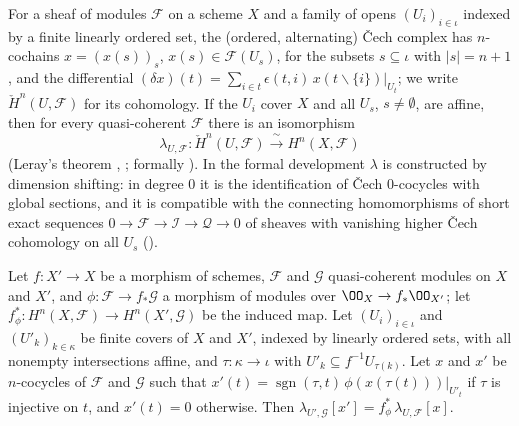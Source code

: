 For a sheaf of modules $\mathcal F$ on a scheme $X$ and a family of opens $(U_i)_{i\in\iota}$ indexed by a finite linearly ordered set, the
(ordered, alternating) \v{C}ech complex has $n$-cochains $x=(x(s))_{s}$, $x(s)\in\mathcal F(U_s)$, for the subsets $s\subseteq\iota$ with $|s|=n+1$,
and the differential $(\delta x)(t)=\sum_{i\in t}\epsilon(t,i)\,x(t\smallsetminus\{i\})|_{U_t}$; we write $\check H^n(U,\mathcal F)$ for its
cohomology. If the $U_i$ cover $X$ and all $U_s$, $s\ne\emptyset$, are affine, then for every quasi-coherent $\mathcal F$ there is an
isomorphism
\[
  \lambda_{U,\mathcal F}\colon\check H^n(U,\mathcal F)\xrightarrow{\ \sim\ }H^n(X,\mathcal F)
\]
(Leray's theorem \cite[Thm.~III.4.5]{Hartshorne1977}, \cite[Tag~01XD]{Stacks2024}; formally ). In the
formal development $\lambda$ is constructed by dimension shifting: in degree $0$ it is the identification of \v{C}ech $0$-cocycles with global
sections, and it is compatible with the connecting homomorphisms of short exact sequences $0\to\mathcal F\to\mathcal I\to\mathcal Q\to0$
of sheaves with vanishing higher \v{C}ech cohomology on all $U_s$ ().

\begin{lemma}\label{pf:hlf-cech:leraynat}
Let $f\colon X'\to X$ be a morphism of schemes, $\mathcal F$ and $\mathcal G$ quasi-coherent modules on $X$ and $X'$, and
$\phi\colon\mathcal F\to f_*\mathcal G$ a morphism of modules over $\OO_X\to f_*\OO_{X'}$; let $f^*_\phi\colon H^n(X,\mathcal F)\to H^n(X',\mathcal G)$
be the induced map. Let $(U_i)_{i\in\iota}$ and $(U'_k)_{k\in\kappa}$ be finite covers of $X$ and $X'$, indexed by linearly ordered sets, with
all nonempty intersections affine, and $\tau\colon\kappa\to\iota$ with $U'_k\subseteq f^{-1}U_{\tau(k)}$. Let $x$ and $x'$ be $n$-cocycles of $\mathcal F$
and $\mathcal G$ such that $x'(t)=\operatorname{sgn}(\tau,t)\,\phi(x(\tau(t)))|_{U'_t}$ if $\tau$ is injective on $t$, and $x'(t)=0$ otherwise. Then
$\lambda_{U',\mathcal G}[x']=f^*_\phi\,\lambda_{U,\mathcal F}[x]$.
\end{lemma}


